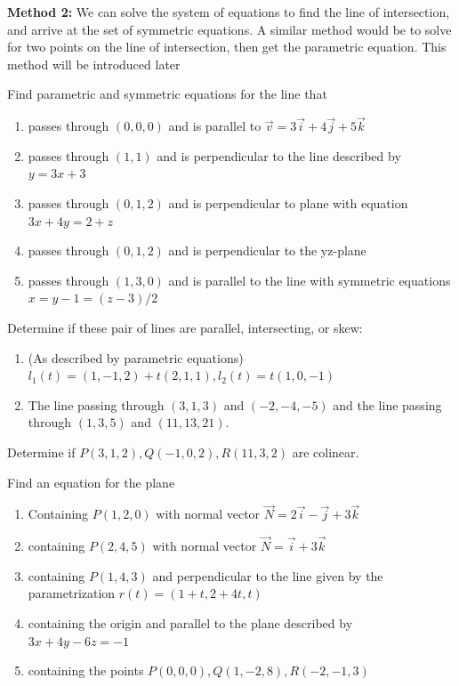 \textbf{Method 2:} We can solve the system of equations to find the line of intersection, and arrive at the set of symmetric equations. A similar method would be to solve for two points on the line of intersection, then get the parametric equation. This method will be introduced later\\
\exercises
\begin{exerciselist}
	\item Find parametric and symmetric equations for the line that \begin{enumerate}[label=(\alph*)]
		\item passes through $(0,0,0)$ and is parallel to $\vec{v}=3\vec{i}+4\vec{j}+5\vec{k}$
		\item passes through $(1,1)$ and is perpendicular to the line described by $y=3x+3$
		\item passes through $(0,1,2)$ and is perpendicular to plane with equation $3x+4y=2+z$
		\item passes through $(0,1,2)$ and is perpendicular to the yz-plane
		\item passes through $(1,3,0)$ and is parallel to the line with symmetric equations $x=y-1=(z-3)/2$
	\end{enumerate}
	\item Determine if these pair of lines are parallel, intersecting, or skew: \begin{enumerate}[label=(\alph*)]
		\item (As described by parametric equations) $l_1(t)=(1,-1,2)+t(2,1,1), l_2(t) = t(1,0,-1)$
		\item The line passing through $(3,1,3)$ and $(-2,-4,-5)$ and the line passing through $(1,3,5)$ and $(11,13,21)$.
	\end{enumerate}
	\item Determine if $P(3,1,2),Q(-1,0,2), R(11,3,2)$ are colinear.
	\item Find an equation for the plane \begin{enumerate}[label=(\alph*)]
		\item Containing $P(1,2,0)$ with normal vector $\vec{N}=2\vec{i}-\vec{j}+3\vec{k}$
		\item containing $P(2,4,5)$ with normal vector $\vec{N}=\vec{i}+3\vec{k}$
		\item containing $P(1,4,3)$ and perpendicular to the line given by the parametrization $r(t)=(1+t,2+4t,t)$
		\item containing the origin and parallel to the plane described by $3x+4y-6z=-1$
		\item containing the points $P(0,0,0),Q(1,-2,8),R(-2,-1,3)$

\end{enumerate}
\end{exerciselist}
